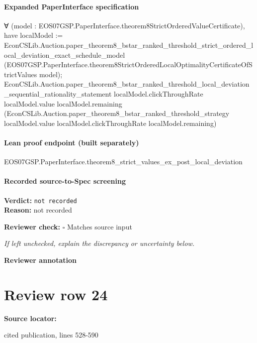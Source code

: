\documentclass[10pt]{article}
\newcommand{\reviewerbox}{%
  \par\noindent\fbox{\parbox{0.96\linewidth}{\rule{0pt}{0.38in}}}\par
}
\newcommand{\reviewmatch}[1]{%
  \par\noindent\textbf{Reviewer check:} $\square$\; #1\par
  \noindent\emph{If left unchecked, explain the discrepancy or uncertainty below.}\par
}
\begin{document}
\paragraph{Expanded PaperInterface specification}
\begin{ReviewVerbatim}
∀ (model : EOS07GSP.PaperInterface.theorem8StrictOrderedValueCertificate),
  have localModel :=
    EconCSLib.Auction.paper_theorem8_bstar_ranked_threshold_strict_ordered_local_deviation_exact_schedule_model
      (EOS07GSP.PaperInterface.theorem8StrictOrderedLocalOptimalityCertificateOfStrictValues model);
  EconCSLib.Auction.paper_theorem8_bstar_ranked_threshold_local_deviation_sequential_rationality_statement
    localModel.clickThroughRate localModel.value localModel.remaining
    (EconCSLib.Auction.paper_theorem8_bstar_ranked_threshold_strategy localModel.value localModel.clickThroughRate
      localModel.remaining)
\end{ReviewVerbatim}

\paragraph{Lean proof endpoint (built separately)}\begin{ReviewVerbatim}
EOS07GSP.PaperInterface.theorem8_strict_values_ex_post_local_deviation
\end{ReviewVerbatim}

\paragraph{Recorded source-to-Spec screening}
\textbf{Verdict:} \texttt{not recorded}
\\
\textbf{Reason:} not recorded
\reviewmatch{Matches source input}
\noindent\textbf{Reviewer annotation}\par
\reviewerbox
\clearpage
\hypertarget{source-claim-a5c03eaebd5250bc}{}
\section*{Review row 24}
\textbf{Source locator:} {\footnotesize\raggedright cited publication, lines 528-\allowbreak{}590\par}
\end{document}
